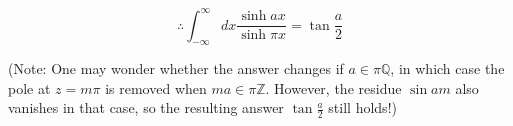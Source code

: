 \[
    \therefore \int_{-\infty}^\infty dx \frac{\sinh ax}{\sinh \pi x} = \tan \frac{a}{2}
\]

(Note: One may wonder whether the answer changes if $a \in \pi\mathbb{Q}$,
in which case the pole at $z = m\pi$ is removed when $ma \in \pi\mathbb{Z}$.
However, the residue $\sin am$ also vanishes in that case,
so the resulting answer $\tan \frac{a}{2}$ still holds!)

	